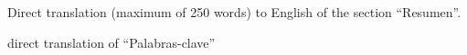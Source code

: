 
Direct translation (maximum of 250 words) to English of the section ``Resumen''.

\mbox{}\linebreak
{} direct translation of ``Palabras-clave''

